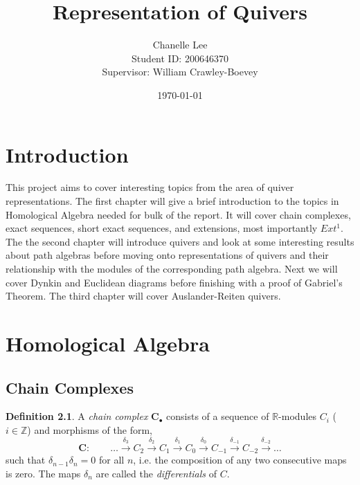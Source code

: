 \documentclass[11.5pt, twoside, a4paper, titlepage]{report}
\theoremstyle{definition}
\newtheorem{mydef}{Definition}[section]
\theoremstyle{plain}
\begin{document}
\title{Representation of Quivers}
\author{Chanelle Lee \\Student ID: 200646370\\Supervisor: William Crawley-Boevey}
\date{\today}
\maketitle


\tableofcontents

\chapter{Introduction}

This project aims to cover interesting topics from the area of quiver representations. The first chapter will give a brief introduction to the topics in Homological Algebra needed for bulk of the report. It will cover chain complexes, exact sequences, short exact sequences, and extensions, most importantly $Ext^1$. The the second chapter will introduce quivers and look at some interesting results about path algebras before moving onto representations of quivers and their relationship with the modules of the corresponding path algebra. Next we will cover Dynkin and Euclidean diagrams before finishing with a proof of Gabriel's Theorem. The third chapter will cover Auslander-Reiten quivers.

\chapter{Homological Algebra}

\section{Chain Complexes}

\begin{mydef}
A \emph{chain complex} $\mathbf{C}_{\bullet}$ consists of a sequence of $\mathbb{R}$-modules $C_i$ ($i \in \mathbb{Z}$) and morphisms of the form,
\begin{equation*}
\mathbf{C}: \qquad \dots \xrightarrow{\delta_{3}} C_2 \xrightarrow{\delta_{2}} C_1 \xrightarrow{\delta_{1 }} C_0 \xrightarrow{\delta_0} C_{-1} \xrightarrow{\delta_{-1}} C_{-2} \xrightarrow{\delta_{-2}}\dots
\end{equation*}
such that $\delta_{n-1}\delta_{n}=0$ for all $n$, i.e. the composition of any two consecutive maps is zero. The maps $\delta_n$ are called the \emph{differentials} of $C$.
\end{mydef}
\end{document}

